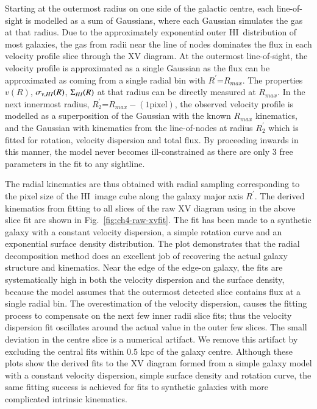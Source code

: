 \documentclass[traditabstract]{aa} %
\newcommand\HI{H{\small I}}
\begin{document}
Starting at the outermost radius on one side of the galactic centre,
each line-of-sight is modelled as a sum of Gaussians, where each Gaussian 
simulates the gas at that radius. Due to the approximately
exponential outer \HI\ distribution of most galaxies, the gas from
radii near the line of nodes dominates the flux in each velocity
profile slice through the XV diagram. At the outermost line-of-sight, the
velocity profile is approximated as a single Gaussian as the flux can
be approximated as coming from a single radial bin with
$R^\prime$=$R_{max}$. The properties $v(R)$, $\sigma_{v,\HI}(R)$,
$\Sigma_{\HI}(R)$ at that radius can be directly measured at
$R_{max}$. In the next innermost radius, $R^\prime_2$=$R_{max}-(1
\textrm{pixel})$, the observed velocity profile is modelled as a
superposition of the Gaussian with the known $R_{max}$ kinematics, and
the Gaussian with kinematics from the line-of-nodes at radius
$R^\prime_2$ which is fitted for rotation, velocity dispersion and
total flux. By proceeding inwards in this manner, the model never
becomes ill-constrained as there are only 3 free parameters in the
fit to any sightline.

The radial kinematics are thus obtained with radial sampling
corresponding to the pixel size of the \HI\ image cube along the galaxy
major axis $R^{\prime}$.  
The derived kinematics from fitting to all slices of the raw XV diagram using
in the above slice fit are shown in Fig.~\ref{fig:ch4-raw-xvfit}.
The fit has been made to a synthetic galaxy with a constant
velocity dispersion, a simple rotation curve and an exponential surface
density distribution. 
The plot demonstrates that the radial decomposition method does an
excellent job of recovering the actual galaxy 
structure and kinematics. 
Near the edge of the edge-on galaxy, the fits are
systematically high in both the velocity dispersion and the surface
density, because the model assumes that the outermost detected slice
contains flux at a single radial bin. The overestimation of the
velocity dispersion, causes the fitting process to compensate on the
next few inner radii slice fits; thus the velocity dispersion fit
oscillates around the actual value in the outer few slices. The small
deviation in the centre slice is a numerical artifact. We remove this
artifact by excluding the central fits within $0.5$ kpc of the galaxy
centre. Although these plots show the derived fits to the XV diagram formed
from a simple galaxy model with a constant velocity dispersion, simple
surface density and rotation curve, the same fitting success is
achieved for fits to synthetic galaxies with more complicated
intrinsic kinematics.
\end{document}
